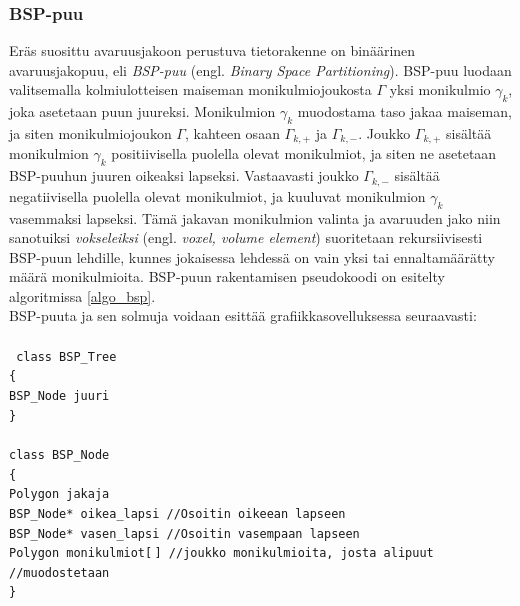 \documentclass[a4paper, 12pt, titlepage]{article}
\newcommand{\tab}[1][0.5cm]{\hspace*{#1}} %
\newcommand{\code}[1]{\small\texttt{#1}} %
\begin{document}
\subsubsection{BSP-puu}

Eräs suosittu avaruusjakoon perustuva tietorakenne on binäärinen avaruusjakopuu, eli \emph{BSP-puu} (engl. \emph{Binary Space Partitioning}). BSP-puu luodaan valitsemalla kolmiulotteisen maiseman  monikulmiojoukosta $\Gamma$ yksi monikulmio $\gamma_k$, joka asetetaan puun juureksi. Monikulmion $\gamma_k$ muodostama taso jakaa maiseman, ja siten monikulmiojoukon $\Gamma$, kahteen osaan $\Gamma_{k,+}$ ja $\Gamma_{k,-}$. Joukko $\Gamma_{k,+}$ sisältää monikulmion $\gamma_k$ positiivisella puolella olevat monikulmiot, ja siten ne asetetaan BSP-puuhun juuren oikeaksi lapseksi. Vastaavasti joukko $\Gamma_{k,-}$ sisältää negatiivisella puolella olevat monikulmiot, ja kuuluvat monikulmion $\gamma_k$ vasemmaksi lapseksi. Tämä jakavan monikulmion valinta ja avaruuden jako niin sanotuiksi \emph{vokseleiksi} (engl. \emph{voxel, volume element}) suoritetaan rekursiivisesti BSP-puun lehdille, kunnes jokaisessa lehdessä on vain yksi tai ennaltamäärätty määrä monikulmioita. \citep[.]{samet} BSP-puun rakentamisen pseudokoodi on esitelty algoritmissa \ref{algo_bsp}.\\

BSP-puuta ja sen solmuja voidaan esittää grafiikkasovelluksessa seuraavasti:\\\\%
\code{
class BSP\_Tree\\
\{\\
\tab BSP\_Node juuri\\
\}\\\\
class BSP\_Node\\
\{\\
\tab Polygon jakaja\\
\tab BSP\_Node* oikea\_lapsi \tab //Osoitin oikeean lapseen\\
\tab BSP\_Node* vasen\_lapsi \tab //Osoitin vasempaan lapseen\\
\tab Polygon monikulmiot[$\,$] \tab //joukko monikulmioita, josta alipuut\\ 
\hspace*{5.2cm} //muodostetaan\\
\}\\}


\end{document}
